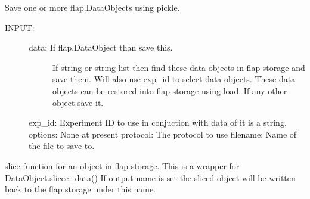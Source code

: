 \documentclass[letterpaper,10pt,english]{sphinxmanual}
\begin{document}
\begin{fulllineitems}
\label{\detokenize{data_object:flap.data_object.save}}
Save one or more flap.DataObject\sphinxhyphen{}s using pickle.
\begin{description}
\item[{INPUT:}] \leavevmode\begin{description}
\item[{data: If flap.DataObject than save this.}] \leavevmode
If string or string list then find these data objects in flap storage and save them.
Will also use exp\_id to select data objects. These data objects can be restored
into flap storage using load.
If any other object save it.

\end{description}

exp\_id: Experiment ID to use in conjuction with data of it is a string.
options: None at present
protocol: The protocol to use
filename: Name of the file to save to.

\end{description}

\end{fulllineitems}


\begin{fulllineitems}
\label{\detokenize{data_object:flap.data_object.slice_data}}
slice function for an object in flap storage. This is a wrapper for DataObject.slicec\_data()
If output name is set the sliced object will be written back to the flap storage under this name.

\end{fulllineitems}
\end{document}
